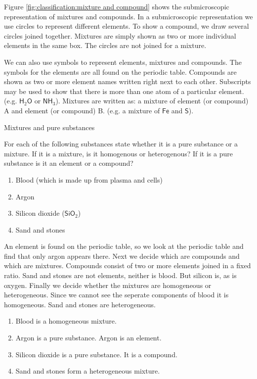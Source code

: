 \label{m38708*eip-487} Figure \ref{fig:classification:mixture and compound} shows the submicroscopic representation of mixtures and compounds. In a submicroscopic representation we use circles to represent different elements. To show a compound, we draw several circles joined together. Mixtures are simply shown as two or more individual elements in the same box. The circles are not joined for a mixture.\par 
\label{m38708*id0124}We can also use symbols to represent elements, mixtures and compounds. The symbols for the elements are all found on the periodic table. Compounds are shown as two or more element names written right next to each other. Subscripts may be used to show that there is more than one atom of a particular element. (e.g. $\mathsf{H}{}_{2}\mathsf{O}$ or $\mathsf{NH}_{3}$). Mixtures are written as: a mixture of element (or compound) A and element (or compound) B. (e.g. a mixture of $\mathsf{Fe}$ and $\mathsf{S}$).\par 
\label{m38708*eip-524}
      \begin{wex}
{Mixtures and pure substances}
{For each of the following substances state whether it is a pure substance or a mixture. If it is a mixture, is it homogenous or heterogenous? If it is a pure substance is it an element or a compound? 
\label{m38708*eip-id1167351497334}\begin{enumerate}[noitemsep, label=\textbf{\alph*}. ] 
\item Blood (which is made up from plasma and cells)
\item Argon
\item Silicon dioxide (${\mathsf{SiO}}_{2}$)
\item Sand and stones
\end{enumerate}
  }
{
An element is found on the periodic table, so we look at the periodic table and find that only argon appears there. Next we decide which are compounds and which are mixtures. Compounds consist of two or more elements joined in a fixed ratio. Sand and stones are not elements, neither is blood. But silicon is, as is oxygen. Finally we decide whether the mixtures are homogeneous or heterogeneous. Since we cannot see the seperate components of blood it is homogeneous. Sand and stones are heterogeneous.
{}
\begin{enumerate}
[noitemsep, label=\textbf{\alph*}. ]
\item Blood is a homogeneous mixture.
\item Argon is a pure substance. Argon is an element.
\item Silicon dioxide is a pure substance. It is a compound.
\item Sand and stones form a heterogeneous mixture.
\end{enumerate}}
    \end{wex}
